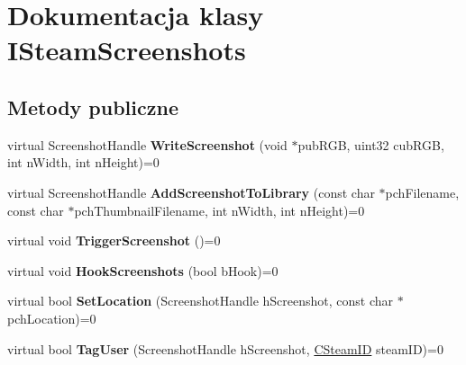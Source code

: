 \hypertarget{class_i_steam_screenshots}{}\section{Dokumentacja klasy I\+Steam\+Screenshots}
\label{class_i_steam_screenshots}
\subsection*{Metody publiczne}
\begin{DoxyCompactItemize}
\item 
\mbox{\label{class_i_steam_screenshots_ad3069b419720346b2eacb014ceae8b3d}} 
virtual Screenshot\+Handle {\bfseries Write\+Screenshot} (void $\ast$pub\+R\+GB, uint32 cub\+R\+GB, int n\+Width, int n\+Height)=0
\item 
\mbox{\label{class_i_steam_screenshots_acadf781133faca81c54d5f5c9cc4982d}} 
virtual Screenshot\+Handle {\bfseries Add\+Screenshot\+To\+Library} (const char $\ast$pch\+Filename, const char $\ast$pch\+Thumbnail\+Filename, int n\+Width, int n\+Height)=0
\item 
\mbox{\label{class_i_steam_screenshots_ae88ff88cf567652fea007c1caaeac5ce}} 
virtual void {\bfseries Trigger\+Screenshot} ()=0
\item 
\mbox{\label{class_i_steam_screenshots_a41cf1b85b6403fd72368422e1b4396b8}} 
virtual void {\bfseries Hook\+Screenshots} (bool b\+Hook)=0
\item 
\mbox{\label{class_i_steam_screenshots_a4d2f4979b52fbf1eded70b117415ebb5}} 
virtual bool {\bfseries Set\+Location} (Screenshot\+Handle h\+Screenshot, const char $\ast$pch\+Location)=0
\item 
\mbox{\label{class_i_steam_screenshots_a6be39bbd3dffe9d68ef0ba008433e661}} 
virtual bool {\bfseries Tag\+User} (Screenshot\+Handle h\+Screenshot, \hyperlink{class_c_steam_i_d}{C\+Steam\+ID} steam\+ID)=0
\item 
\mbox{\label{class_i_steam_screenshots_a1ac5913e5dbb450f06b7d3e5da1f2892}} 

\end{DoxyCompactItemize}
